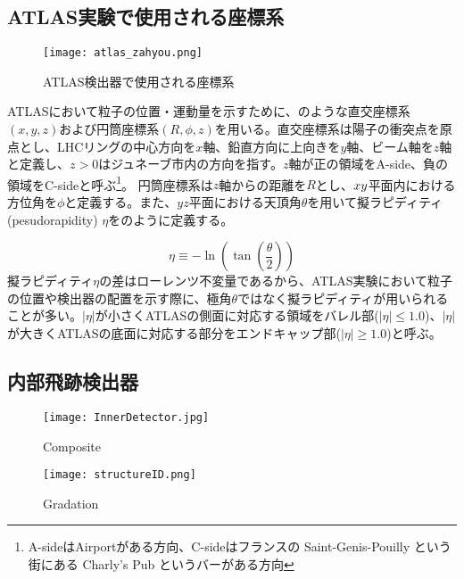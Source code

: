 \subsection{ATLAS実験で使用される座標系}
\label{sec:zahyoukei}
\begin{figure}[tbp]
  \centering
  \texttt{[image: atlas\_zahyou.png]}
  \caption[ATLAS検出器]{ATLAS検出器で使用される座標系 \cite{ATLAS} }
  \label{fig:atlaszahyou}
\end{figure}

ATLASにおいて粒子の位置・運動量を示すために、のような直交座標系$\left( x, y, z \right)$および円筒座標系$\left( R, \phi, z \right)$を用いる。直交座標系は陽子の衝突点を原点とし、LHCリングの中心方向を$x$軸、鉛直方向に上向きを$y$軸、ビーム軸を$z$軸と定義し、$z>0$はジュネーブ市内の方向を指す。$z$軸が正の領域をA-side、負の領域をC-sideと呼ぶ\footnote{A-sideはAirportがある方向、C-sideはフランスの Saint-Genis-Pouilly という街にある Charly's Pub というバーがある方向}。
円筒座標系は$z$軸からの距離を$R$とし、$x\-y$平面内における方位角を$\phi$と定義する。また、$yz$平面における天頂角$\theta$を用いて擬ラピディティ(pesudorapidity) $\eta$をのように定義する。

\begin{equation}
  \label{eq:eta}
  \eta \equiv  -\ln\left( \tan{\left( \frac{\theta}{2} \right)} \right)
\end{equation}
擬ラピディティ$\eta$の差はローレンツ不変量であるから、ATLAS実験において粒子の位置や検出器の配置を示す際に、極角$\theta$ではなく擬ラピディティが用いられることが多い。$|\eta|$が小さくATLASの側面に対応する領域をバレル部($|\eta|\leq 1.0$)、$|\eta|$が大きくATLASの底面に対応する部分をエンドキャップ部($|\eta|\geq 1.0$)と呼ぶ。

\subsection{内部飛跡検出器}
\label{sec:InnerDetector}
\begin{figure}[tbp]
  \begin{minipage}[b]{0.45\linewidth}
    \centering
    \texttt{[image: InnerDetector.jpg]}
    \caption{Composite}
    \label{fig:InnerDetector}
  \end{minipage}
  \begin{minipage}[b]{0.45\linewidth}
    \centering
    \texttt{[image: structureID.png]}
    \caption{Gradation}
    \label{fig:structureID}
  \end{minipage}
\end{figure}

